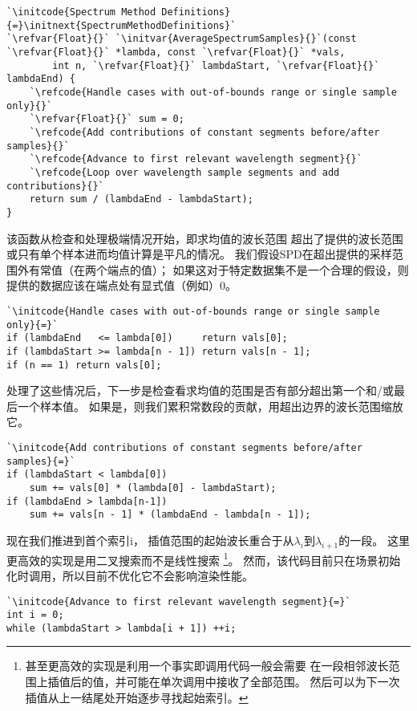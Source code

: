 \begin{lstlisting}
`\initcode{Spectrum Method Definitions}{=}\initnext{SpectrumMethodDefinitions}`
`\refvar{Float}{}` `\initvar{AverageSpectrumSamples}{}`(const `\refvar{Float}{}` *lambda, const `\refvar{Float}{}` *vals,
        int n, `\refvar{Float}{}` lambdaStart, `\refvar{Float}{}` lambdaEnd) {
    `\refcode{Handle cases with out-of-bounds range or single sample only}{}`
    `\refvar{Float}{}` sum = 0;
    `\refcode{Add contributions of constant segments before/after samples}{}`
    `\refcode{Advance to first relevant wavelength segment}{}`
    `\refcode{Loop over wavelength sample segments and add contributions}{}`
    return sum / (lambdaEnd - lambdaStart);
}
\end{lstlisting}

该函数从检查和处理极端情况开始，即求均值的波长范围
超出了提供的波长范围或只有单个样本进而均值计算是平凡的情况。
我们假设SPD在超出提供的采样范围外有常值（在两个端点的值）；
如果这对于特定数据集不是一个合理的假设，则提供的数据应该在端点处有显式值（例如）0。
\begin{lstlisting}
`\initcode{Handle cases with out-of-bounds range or single sample only}{=}`
if (lambdaEnd   <= lambda[0])     return vals[0];
if (lambdaStart >= lambda[n - 1]) return vals[n - 1];
if (n == 1) return vals[0];
\end{lstlisting}

处理了这些情况后，下一步是检查看求均值的范围是否有部分超出第一个和/或最后一个样本值。
如果是，则我们累积常数段的贡献，用超出边界的波长范围缩放它。
\begin{lstlisting}
`\initcode{Add contributions of constant segments before/after samples}{=}`
if (lambdaStart < lambda[0])
    sum += vals[0] * (lambda[0] - lambdaStart);
if (lambdaEnd > lambda[n-1])
    sum += vals[n - 1] * (lambdaEnd - lambda[n - 1]);
\end{lstlisting}

现在我们推进到首个索引{\ttfamily i}，
插值范围的起始波长重合于从$\lambda_i$到$\lambda_{i+1}$的一段。
这里更高效的实现是用二叉搜索而不是线性搜索
\footnote{甚至更高效的实现是利用一个事实即调用代码一般会需要
    在一段相邻波长范围上插值后的值，并可能在单次调用中接收了全部范围。
    然后可以为下一次插值从上一结尾处开始逐步寻找起始索引。}。
然而，该代码目前只在场景初始化时调用，所以目前不优化它不会影响渲染性能。
\begin{lstlisting}
`\initcode{Advance to first relevant wavelength segment}{=}`
int i = 0;
while (lambdaStart > lambda[i + 1]) ++i;
\end{lstlisting}


